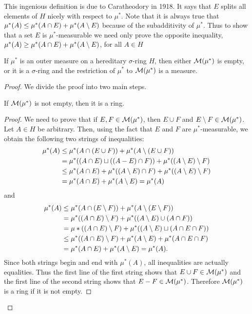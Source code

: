 This ingenious definition is due to Caratheodory in 1918. It says that $E$ splits all elements of $H$ nicely with respect to $\mu^*$. Note that it is always true that $\mu^*(A) \leq \mu^*(A\cap E)+\mu^*(A\setminus E)$ because of the subadditivity of $\mu^*$. Thus to show that a set $E$ is $\mu^*$-measurable we need only prove the opposite inequality, $\mu^*(A)\geq\mu^*(A\cap E)+\mu^*(A\setminus E)$, for all $A\in H$

\begin{theorem}
If $\mu^*$ is an outer measure on a hereditary $\sigma$-ring $H$, then either ${\cal M}(\mu^*)$ is empty, or it is a $\sigma$-ring and the restriction of $\mu^*$ to ${\cal M}(\mu^*)$ is a measure.
\end{theorem}

\begin{proof}

We divide the proof into two main steps.

\begin{lemma}
If ${\cal M}(\mu^*)$ is not empty, then it is a ring.
\end{lemma}
\begin{proof}
We need to prove that if $E,F \in {\cal M}(\mu^*)$, then $E \cup F$ and $E\setminus F \in {\cal M}(\mu^*)$. Let ${A} \in {H}$ be arbitrary. Then, using the fact that $E$ and ${F}$ are $\mu^*$-measurable, we obtain the following two strings of inequalities:
\begin{align*}
    \mu^*(A)&\leq\mu^*(A \cap(E \cup F))+\mu^*(A\setminus(E \cup F)) \\
    &=\mu^*((A \cap E) \sqcup((A-E) \cap F))+\mu^*((A\setminus E)\setminus F) \\
    & \leq \mu^*(A \cap E)+\mu^*((A\setminus E) \cap F)+\mu^*((A\setminus E)\setminus F) \\
    &=\mu^*(A \cap E)+\mu^*(A\setminus E)=\mu^*(A)
\end{align*}
and
\begin{align*}
\mu^*(A) & \leq \mu^*(A \cap(E\setminus F))+\mu^*(A\setminus (E\setminus F)) \\
&=\mu^*((A \cap E)\setminus F)+\mu^*((A\setminus E) \cup(A \cap F)) \\
&=\mu *((A \cap E)\setminus F)+\mu^*((A\setminus E) \sqcup(A \cap E \cap F)) \\
& \leq \mu^*((A \cap E)\setminus F)+\mu^*(A\setminus E)+\mu^*(A \cap E \cap F) \\
&=\mu^*(A \cap E)+\mu^*(A\setminus E)=\mu^*(A) .
\end{align*}
Since both strings begin and end with $\mu^*(A)$, all inequalities are actually equalities. Thus the first line of the first string shows that $E \cup F \in {\cal M}(\mu^*)$ and the first line of the second string shows that $E-F \in {\cal M}(\mu^*)$. Therefore ${\cal M}(\mu^*)$ is a ring if it is not empty.
\end{proof}


\end{proof}
